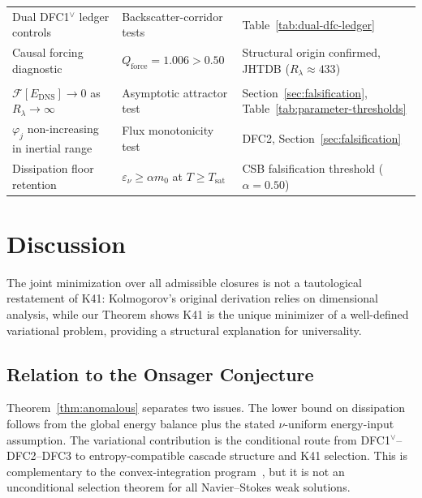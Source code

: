 \documentclass[12pt,a4paper]{article}
\theoremstyle{breakdef}
\theoremstyle{breakplain}
\theoremstyle{breakdef}
\begin{document}
\begin{table}[htbp]
\begin{tabularx}{\textwidth}{>{\raggedright\arraybackslash}p{4.2cm} >{\raggedright\arraybackslash}p{3.8cm} Y}
Dual DFC1$^\vee$ ledger controls & Backscatter-corridor tests & Table~\ref{tab:dual-dfc-ledger} \\
Causal forcing diagnostic & $Q_{\mathrm{force}} = 1.006 > 0.50$ & Structural origin confirmed, JHTDB ($R_\lambda \approx 433$) \\
\addlinespace[4pt]
 \\
\addlinespace[2pt]
$\mathcal{F}[E_{\mathrm{DNS}}] \to 0$ as $R_\lambda \to \infty$ & Asymptotic attractor test & Section~\ref{sec:falsification}, Table~\ref{tab:parameter-thresholds} \\
$\varphi_j$ non-increasing in inertial range & Flux monotonicity test & DFC2, Section~\ref{sec:falsification} \\
Dissipation floor retention & $\varepsilon_\nu \ge \alpha m_0$ at $T \ge T_{\mathrm{sat}}$ & CSB falsification threshold ($\alpha = 0.50$) \\
\bottomrule
\end{tabularx}
\end{table}

\section{Discussion}\label{sec:discussion}

The joint minimization over all admissible closures is not a tautological restatement of K41: Kolmogorov's original derivation relies on dimensional analysis, while our Theorem shows K41 is the unique minimizer of a well-defined variational problem, providing a structural explanation for universality.

\subsection{Relation to the Onsager Conjecture}

Theorem~\ref{thm:anomalous} separates two issues. The lower bound on
dissipation follows from the global energy balance plus the stated
\(\nu\)-uniform energy-input assumption. The variational contribution is
the conditional route from DFC1$^\vee$--DFC2--DFC3 to entropy-compatible
cascade structure and K41 selection. This is complementary to the
convex-integration program~\cite{Isett18,BV19,AlbrittonBrueColombo2022}, but it is not an
unconditional selection theorem for all Navier--Stokes weak solutions.
\end{document}
